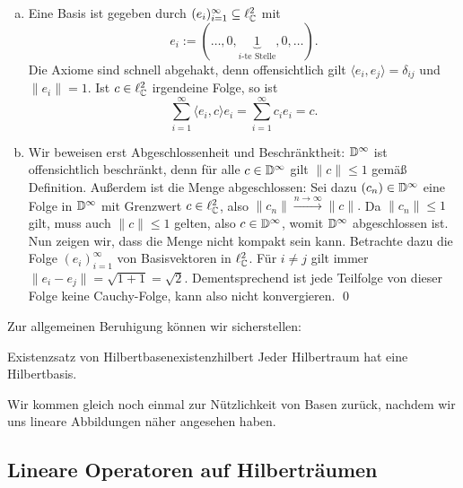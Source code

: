 \begin{lösung}
	\begin{enumerate}[a)]
		\item Eine Basis ist gegeben durch $(e_i)_{i=1}^\infty \subseteq \ell^2_{\mathbb{C}}$ mit $$e_i := (\dots, 0, \underbrace{1}_{i\text{-te Stelle}}, 0, \dots).$$ Die Axiome sind schnell abgehakt, denn offensichtlich gilt $\langle e_i, e_j \rangle = \delta_{ij}$ und $\|e_i\| =1$. Ist $c \in \ell_{\mathbb{C}}^2$ irgendeine Folge, so ist
		\begin{equation}
			\sum_{i=1}^\infty \langle e_i, c \rangle e_i = \sum_{i=1}^\infty c_i e_i = c.
		\end{equation}
		\item Wir beweisen erst Abgeschlossenheit und Beschränktheit: $\mathbb{D}^\infty$ ist offensichtlich beschränkt, denn für alle $c \in \mathbb{D}^\infty$ gilt $\|c\| \leq 1$ gemäß Definition. Außerdem ist die Menge abgeschlossen: Sei dazu $(c_n) \in \mathbb{D}^\infty$ eine Folge in $\mathbb{D}^\infty$ mit Grenzwert $c \in \ell^2_{\mathbb{C}}$, also $\|c_n\| \overset{n \to \infty}\to \|c\|.$ Da $\|c_n\| \leq 1$ gilt, muss auch $\|c\| \leq 1$ gelten, also $c \in \mathbb{D}^\infty$, womit $\mathbb{D}^\infty$ abgeschlossen ist.
		Nun zeigen wir, dass die Menge nicht kompakt sein kann. Betrachte dazu die Folge $(e_i)_{i =1}^\infty$ von Basisvektoren in $\ell_{\mathbb{C}}^2$. Für $i \neq j$ gilt immer $\|e_i -e_j\| = \sqrt{1+1} = \sqrt{2}$. Dementsprechend ist jede Teilfolge von dieser Folge keine Cauchy-Folge, kann also nicht konvergieren. \qed
	\end{enumerate}
\end{lösung}

Zur allgemeinen Beruhigung können wir sicherstellen:

\begin{theorem}{Existenzsatz von Hilbertbasen}{existenzhilbert}
Jeder Hilbertraum hat eine Hilbertbasis.
\end{theorem}

Wir kommen gleich noch einmal zur Nützlichkeit von Basen zurück, nachdem wir uns lineare Abbildungen näher angesehen haben.

\subsection{Lineare Operatoren auf Hilberträumen}

